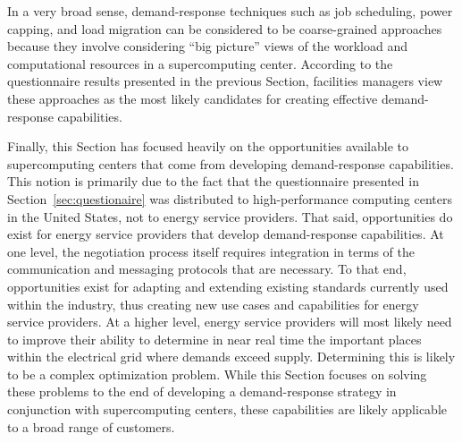 In a very broad sense, demand-response techniques such as job scheduling,
power capping, and load migration can be considered to be coarse-grained
approaches because they involve considering ``big picture'' views of the
workload and computational resources in a supercomputing center.  According
to the questionnaire results presented in the previous Section, facilities
managers view these approaches as the most likely candidates for creating
effective demand-response capabilities.

Finally, this Section has focused heavily on the opportunities available
to supercomputing centers that come from developing demand-response
capabilities.  This notion is primarily due to the fact that the
questionnaire presented in Section~\ref{sec:questionaire} was
distributed to high-performance computing centers in the United
States, not to energy service providers.  That said, opportunities do
exist for energy service providers that develop demand-response
capabilities.  At one level, the negotiation process itself requires
integration in terms of the communication and messaging protocols that
are necessary.  To that end, opportunities exist for adapting and extending
existing standards currently used within the industry, thus creating new
use cases and capabilities for energy service providers.  At a higher
level, energy service providers will most likely need to improve their
ability to determine in near real time the important places within the
electrical grid where demands exceed supply.  Determining this is likely
to be a complex optimization problem.  While this Section focuses on
solving these problems to the end of developing a demand-response
strategy in conjunction with supercomputing centers, these capabilities
are likely applicable to a broad range of customers.
